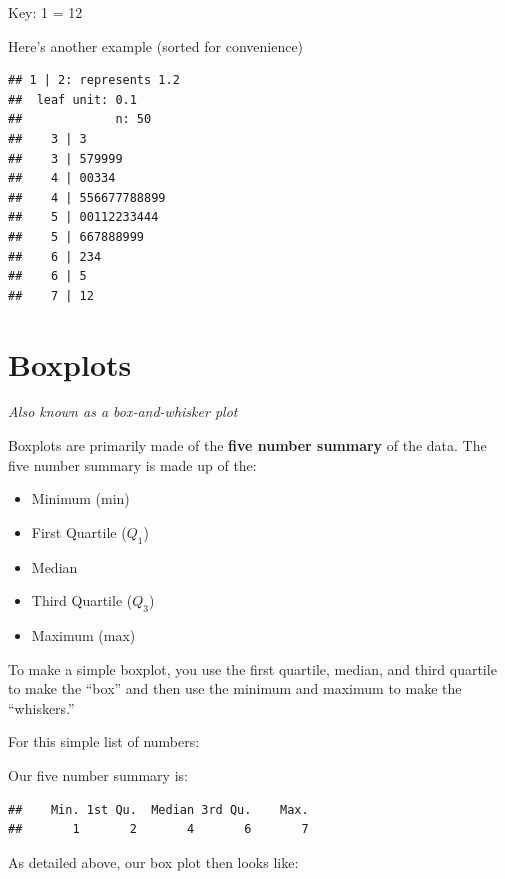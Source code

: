 \documentclass[
]{book}
\theoremstyle{definition}
\theoremstyle{definition}
\theoremstyle{definition}
\theoremstyle{definition}
\theoremstyle{remark}
\begin{document}
Key: 1 = 12

Here's another example (sorted for convenience)

\begin{verbatim}
## 1 | 2: represents 1.2
##  leaf unit: 0.1
##             n: 50
##    3 | 3
##    3 | 579999
##    4 | 00334
##    4 | 556677788899
##    5 | 00112233444
##    5 | 667888999
##    6 | 234
##    6 | 5
##    7 | 12
\end{verbatim}

\hypertarget{boxplots}{%
\section{Boxplots}\label{boxplots}}

\emph{Also known as a box-and-whisker plot}

Boxplots are primarily made of the \textbf{five number summary} of the data.
The five number summary is made up of the:

\begin{itemize}
\item
  Minimum (min)
\item
  First Quartile (\(Q_1\))
\item
  Median
\item
  Third Quartile (\(Q_3\))
\item
  Maximum (max)
\end{itemize}

To make a simple boxplot, you use the first quartile, median, and third
quartile to make the ``box'' and then use the minimum and maximum to make
the ``whiskers.''

For this simple list of numbers:

Our five number summary is:

\begin{verbatim}
##    Min. 1st Qu.  Median 3rd Qu.    Max. 
##       1       2       4       6       7
\end{verbatim}

As detailed above, our box plot then looks like:
\end{document}
